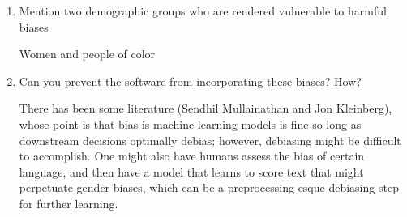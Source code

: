 \documentclass[12pt]{article}
\begin{document}
\begin{enumerate}
    \item Mention two demographic groups who are rendered vulnerable to harmful biases
    
    Women and people of color
    
    \item Can you prevent the software from incorporating these biases? How?
    
    There has been some literature (Sendhil Mullainathan and Jon Kleinberg), whose point is that bias is machine learning models is fine so long as downstream decisions optimally debias; however, debiasing might be difficult to accomplish. One might also have humans assess the bias of certain language, and then have a model that learns to score text that might perpetuate gender biases, which can be a preprocessing-esque debiasing step for further learning. 
\end{enumerate}
\end{document}

